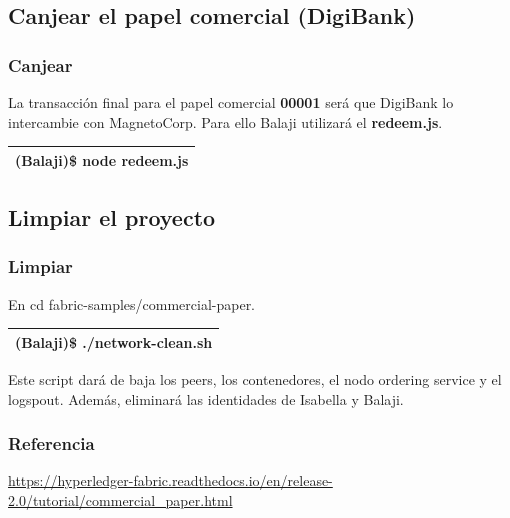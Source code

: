 \documentclass{beamer}
\begin{document}
	\subsection{Canjear el papel comercial (DigiBank)}
	
	\begin{frame}
		\frametitle{Canjear}
		La transacción final para el papel comercial \textbf{00001} será que DigiBank lo intercambie con MagnetoCorp. Para ello Balaji utilizará el \textbf{redeem.js}.\\
		\begin{center}
			\begin{tabulary}{\linewidth}{L}
				\hline
				(Balaji)\$ node redeem.js \\
				\hline
			\end{tabulary} 
		\end{center}
	\end{frame}
	
	\subsection{Limpiar el proyecto}
	
	\begin{frame}
		\frametitle{Limpiar}
		En cd fabric-samples/commercial-paper.\\
		\begin{center}
			\begin{tabulary}{\linewidth}{L}
				\hline
				(Balaji)\$ ./network-clean.sh \\
				\hline
			\end{tabulary} 
		\end{center}
		Este script dará de baja los peers, los contenedores, el nodo ordering service y el logspout. Además, eliminará las identidades de Isabella y Balaji.
	\end{frame}
	
	\begin{frame}
		\frametitle{Referencia}
		\begin{center}
			\url{https://hyperledger-fabric.readthedocs.io/en/release-2.0/tutorial/commercial\_paper.html}
		\end{center}
	\end{frame}
\end{document}
